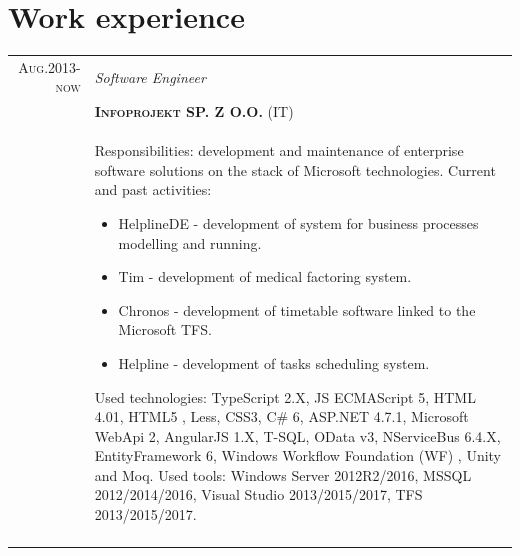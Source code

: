 \documentclass[a4paper,12pt]{article}
\begin{document}
\section{Work experience}
\begin{tabular}{r|p{12cm}}
\textsc{Aug.2013-now}
	&\emph{Software Engineer} \\
	&\textsc{\textbf{Infoprojekt SP. Z O.O.}} (IT) \\
	&\footnotesize{
		Responsibilities: development and maintenance of enterprise software solutions on the stack of Microsoft technologies. \newline
		Current and past activities:
		\begin{itemize}
			\item HelplineDE - development of system for business processes modelling and running.
		        \item Tim -  development of medical factoring system.
		        \item Chronos - development of timetable software linked to the Microsoft TFS.
			\item Helpline - development of tasks scheduling system.
		\end{itemize}
		Used technologies: \newline
		TypeScript 2.X, JS ECMAScript 5, HTML 4.01, HTML5 , Less, CSS3, C\# 6, ASP.NET 4.7.1, Microsoft WebApi 2, AngularJS 1.X, T-SQL,
		OData v3, NServiceBus 6.4.X, EntityFramework 6, Windows Workflow Foundation (WF) , Unity and Moq. \newline
		Used tools: \newline
		Windows Server 2012R2/2016, MSSQL 2012/2014/2016, Visual Studio 2013/2015/2017, TFS 2013/2015/2017.
	}\\
	\multicolumn{2}{c}{}\\

\end{tabular}
\end{document}
